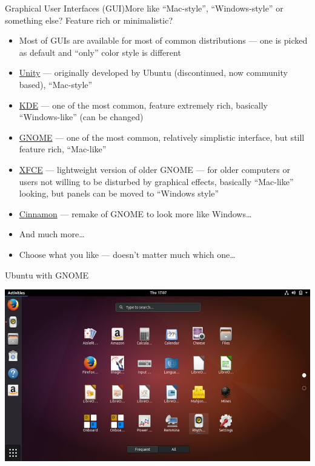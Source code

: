 \documentclass[compress, ucs, xelatex, 11pt, xcolor=svgnames,
  hyperref={
    bookmarks=true,
    unicode=true,
    colorlinks=true,
    pdftitle={Linux, command line and MetaCentrum},
    plainpages=false,
    pdfauthor={Vojtech Zeisek},
    pdfsubject={Course about use of Linux command line, writing shell scripts and using MetaCentrum of CESNET},
    pdfcreator={XeLaTeX},
    pdfkeywords={Linux, GNU, BASH, shell, command line, MetaCentrum},
    linkcolor=DarkRed,
    anchorcolor=DarkBlue,
    citecolor=Indigo,
    filecolor=NavyBlue,
    menucolor=DarkMagenta,
    urlcolor=DarkBlue,
    pdftex},
  url={hyphens, lowtilde} %
  ]{beamer}
\begin{document}
\begin{frame}{Graphical User Interfaces (GUI)}{More like ``Mac-style'', ``Windows-style'' or something else? Feature rich or minimalistic?}
  \begin{itemize}
    \item Most of GUIs are available for most of common distributions --- one is picked as default and ``only'' color style is different
    \item \href{https://code.launchpad.net/unity}{Unity} --- originally developed by Ubuntu (discontinued, now community based), ``Mac-style''
    \item \href{https://www.kde.org/}{KDE} --- one of the most common, feature extremely rich, basically ``Windows-like'' (can be changed)
    \item \href{https://www.gnome.org/}{GNOME} --- one of the most common, relatively simplistic interface, but still feature rich, ``Mac-like''
    \item \href{http://xfce.org/}{XFCE} --- lightweight version of older GNOME --- for older computers or users not willing to be disturbed by graphical effects, basically ``Mac-like'' looking, but panels can be moved to ``Windows style''
    \item \href{http://developer.linuxmint.com/projects/cinnamon-projects.html}{Cinnamon} --- remake of GNOME to look more like Windows\ldots
    \item And much more\ldots
    \item Choose what you like --- doesn't matter much which one\ldots
  \end{itemize}
\end{frame}

\begin{frame}{Ubuntu with GNOME} %
  \begin{center}
    \includegraphics[width=\textwidth]{ubuntu.png}
  \end{center}
\end{frame}
\end{document}
